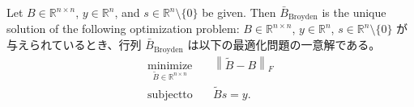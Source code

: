 \documentclass[0_main]{subfiles}
\begin{document}
\begin{proposition}
    \ifEn
        Let $B\in\mathbb{R}^{n\times n}$, $y\in\mathbb{R}^n$, and $s\in\mathbb{R}^n\setminus\{ 0 \}$ be given. Then $\bar{B}_{\mathrm{Broyden}}$ is the unique solution of the following optimization problem:
    \else
        $B\in\mathbb{R}^{n\times n}$, $y\in\mathbb{R}^n$, $s\in\mathbb{R}^n\setminus\{ 0 \}$ が与えられているとき、行列 $\bar{B}_{\mathrm{Broyden}}$ は以下の最適化問題の一意解である。
    \fi
    \begin{align*}
        \underset{\tilde{B} \in \mathbb{R}^{n \times n}}{\mathrm{minimize}} & \quad \left\lVert \tilde{B} - B \right\rVert_F \\
        \mathrm{subject to}                                                 & \quad \tilde{B} s = y.
    \end{align*}
\end{proposition}
\end{document}
